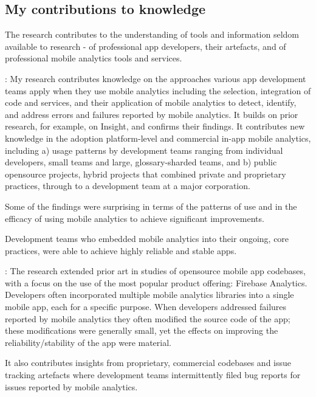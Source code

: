 \subsection{My contributions to knowledge}
The research contributes to the understanding of tools and information seldom available to research - of professional app developers, their artefacts, and of professional mobile analytics tools and services. 

: 
My research contributes knowledge on the approaches various app development teams apply when they use mobile analytics including the selection, integration of code and services, and their application of mobile analytics to detect, identify, and address errors and failures reported by mobile analytics. It builds on prior research, for example, on Insight, and confirms their findings. It contributes new knowledge in the adoption platform-level and commercial in-app mobile analytics, including a) usage patterns by development teams ranging from individual  developers, small teams and large,  \gls{glossary-sharded} teams, and b) public opensource projects, hybrid projects that combined private and proprietary practices, through to a development team at a major corporation.

Some of the findings were surprising in terms of the patterns of use and in the efficacy of using mobile analytics to achieve significant improvements.

Development teams who embedded mobile analytics into their ongoing, core practices, were able to achieve highly reliable and stable apps. 

: 
The research extended prior art in studies of opensource mobile app codebases, with a focus on the use of the most popular product offering: Firebase Analytics. Developers often incorporated multiple mobile analytics libraries into a single mobile app, each for a specific purpose. When developers addressed failures reported by mobile analytics they often modified the source code of the app; these modifications were generally small, yet the effects on improving the reliability/stability of the app were material. 

It also contributes insights from proprietary, commercial codebases and issue tracking artefacts where development teams intermittently filed bug reports for issues reported by mobile analytics.

